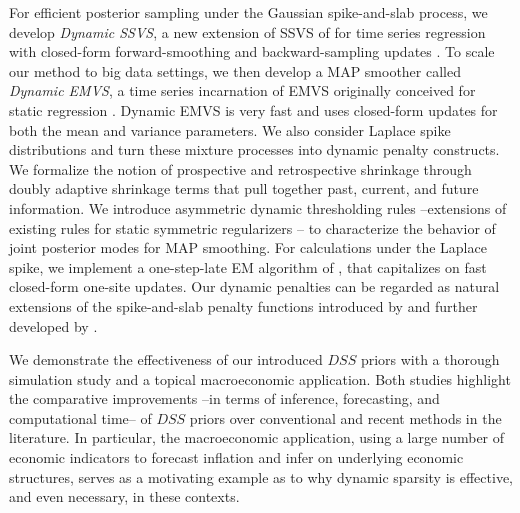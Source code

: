 \documentclass[ba]{imsart}
\numberwithin{equation}{section}
\theoremstyle{plain}
\begin{document}
{For efficient posterior sampling under the Gaussian spike-and-slab process, we develop {\em Dynamic SSVS}, a new extension of SSVS of \cite{GM93} for time series regression with closed-form forward-smoothing and backward-sampling updates \citep{Schnatter1994}.
To scale our method to big data settings, we then develop a MAP smoother  called {\em Dynamic EMVS}, a time series incarnation of EMVS originally conceived for static regression
 \citep{RG14}. 
Dynamic EMVS is very fast and uses closed-form updates for both the mean and variance parameters. }
We also consider Laplace spike distributions and turn these mixture processes  into dynamic penalty constructs. We formalize the notion of prospective and retrospective shrinkage through doubly adaptive shrinkage terms that pull together past, current, and future information. We introduce asymmetric dynamic thresholding rules --extensions of existing rules for static symmetric regularizers \citep{fanli,antoniadis_fan}-- to characterize the behavior of joint posterior modes for MAP smoothing.  For calculations under the Laplace spike, we implement a one-step-late EM algorithm of \citep{green_OSL}, that capitalizes on fast closed-form one-site updates. 
Our dynamic penalties can be regarded as natural extensions of the spike-and-slab penalty functions  introduced by \cite{rockova15} and further developed by \cite{SSL}. 

{We demonstrate the effectiveness of our introduced $DSS$ priors with a thorough simulation study and a topical macroeconomic application.
Both studies highlight the comparative improvements --in terms of inference, forecasting, and computational time-- of $DSS$ priors over conventional and recent methods in the literature.
In particular, the macroeconomic application, using a large number of economic indicators to forecast inflation and infer on underlying economic structures, serves as a motivating example as to why dynamic sparsity is  effective, and even necessary, in these contexts.
}
\end{document}

